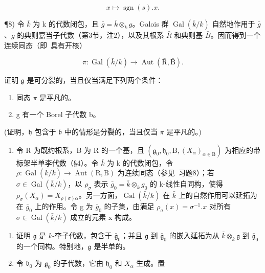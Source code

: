 \[
x \mapsto \operatorname{sgn} (s). x.
\]

¶8) 令 \(\bar{k}\) 为 k 的代数闭包，且 \(\bar{g} = \bar{k} \otimes_{k} g\)。Galois 群 \(\operatorname{Gal}(\bar{k}/k)\) 自然地作用于 \(\bar{g}\)、\(\bar{g}\) 的典则嘉当子代数（第3节，注2），以及其根系 \(\bar{R}\) 和典则基 \(\bar{B}\)。因而得到一个连续同态（即~具有开核）

\[
\pi : \operatorname{Gal} (\bar {k} / k) \to \operatorname{Aut} (\bar {\mathrm{R}}, \bar {\mathrm{B}}).
\]

证明 \(\mathfrak{g}\) 是可分裂的，当且仅当满足下列两个条件：

\begin{enumerate}
\def\labelenumi{(\roman{enumi})}
\item
  同态 \(\pi\) 是平凡的。
\item
  g 有一个 Borel 子代数 b。
\end{enumerate}

(证明，\(\mathfrak{h}\) 包含于 \(\mathfrak{b}\) 中的情形是分裂的，当且仅当 \(\pi\) 是平凡的。)

\begin{enumerate}
\def\labelenumi{\arabic{enumi})}
\setcounter{enumi}{8}
\tightlist
\item
  令 R 为既约根系，B 为 R 的一个基，且 \((\mathfrak{g}_{0}, \mathfrak{h}_{0}, \mathrm{B}, (X_{\alpha})_{\alpha \in \mathrm{B}})\) 为相应的带标架半单李代数（§4）。令 \(\bar{k}\) 为 k 的代数闭包，令 \(\rho : \operatorname{Gal}(\bar{k}/k) \to \operatorname{Aut}(\mathrm{R}, \mathrm{B})\) 为连续同态（参见~习题8）；若 \(\sigma \in \operatorname{Gal}(\bar{k}/k)\)，以 \(\rho_{\sigma}\) 表示 \(\bar{g}_{0} = \bar{k} \otimes_{k} g_{0}\) 的 k-线性自同构，使得 \(\rho_{\sigma}(X_{\alpha}) = X_{\rho(\sigma)\alpha}\)。另一方面，\(\operatorname{Gal}(\bar{k}/k)\) 在 \(\bar{k}\) 上的自然作用可以延拓为在 \(\bar{g}_{0}\) 上的作用。令 g 为 \(\bar{g}_{0}\) 的子集，由满足 \(\rho_{\sigma}(x) = \sigma^{-1}.x\) 对所有 \(\sigma \in \operatorname{Gal}(\bar{k}/k)\) 成立的元素 x 构成。
\end{enumerate}

\begin{enumerate}
\def\labelenumi{\alph{enumi})}
\item
  证明 \(\mathfrak{g}\) 是 \(k\)-李子代数，包含于 \(\bar{\mathfrak{g}}_0\)；并且 \(\mathfrak{g}\) 到 \(\bar{\mathfrak{g}}_0\) 的嵌入延拓为从 \(\bar{k} \otimes_k \mathfrak{g}\) 到 \(\bar{\mathfrak{g}}_0\) 的一个同构。特别地，\(\mathfrak{g}\) 是半单的。
\item
  令 \(\mathfrak{b}_0\) 为 \(\mathfrak{g}_0\) 的子代数，它由 \(\mathfrak{h}_0\) 和 \(X_{\alpha}\) 生成。置
\end{enumerate}

